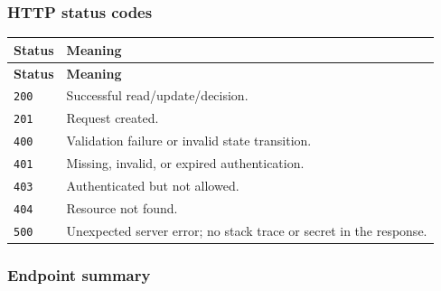 \documentclass[11pt,a4paper]{article}
\begin{document}
\subsubsection{HTTP status codes}

\vspace{0.3em}
\begin{longtable}{|>{\RaggedRight}p{4.5cm}|>{\RaggedRight}p{11.3cm}|}
\hline
\rowcolor{zenPale}\textbf{Status} & \textbf{Meaning} \\ \hline
\endfirsthead
\hline
\rowcolor{zenPale}\textbf{Status} & \textbf{Meaning} \\ \hline
\endhead
\hline
\endfoot
\texttt{200} & Successful read/update/decision. \\ \hline
\texttt{201} & Request created. \\ \hline
\texttt{400} & Validation failure or invalid state transition. \\ \hline
\texttt{401} & Missing, invalid, or expired authentication. \\ \hline
\texttt{403} & Authenticated but not allowed. \\ \hline
\texttt{404} & Resource not found. \\ \hline
\texttt{500} & Unexpected server error; no stack trace or secret in the response. \\ \hline
\end{longtable}
\vspace{0.3em}

\subsubsection{Endpoint summary}
\end{document}
